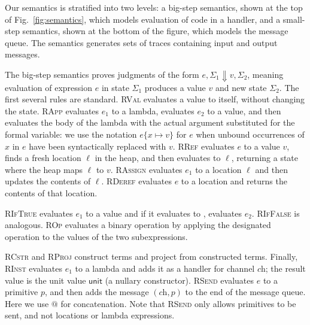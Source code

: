 \documentclass[10pt,conference,compsocconf]{IEEEtran}
\newcommand{\code}[1]{\text{\lstinline!#1!}}
\newcommand{\aset}[1]{\{#1\}}
\newcommand{\sfmt}[1]{\textsf{#1}}
\newcommand{\sch}{\textit{ch}}
\newcommand{\loc}{\ell}
\newcommand{\sunit}{\sfmt{unit}}
\newcommand{\sreduce}{\Downarrow}
\newcommand{\xv}{p}
\newcommand{\comment}[3][\color{red}]{{#1{[{#2}: {#3}]}}}
\newcommand{\kris}[1]{\comment[\color{orange}]{kris}{#1}}
\newcommand{\mrc}[1]{\comment[\color{blue}]{MRC}{#1}}
\begin{document}
Our semantics is stratified into two levels: a big-step semantics,
shown at the top of Fig.~\ref{fig:semantics}, which models evaluation of code in a
handler, and a small-step semantics, shown at the bottom of the
figure, which models the message queue.  The semantics generates sets
of traces containing input and output messages.


The big-step semantics proves judgments of the form
$e, \Sigma_1 \sreduce v, \Sigma_2$, meaning
evaluation of expression $e$ in state $\Sigma_1$ produces a value $v$ and
new state $\Sigma_2$. 
The first several rules are standard.
\textsc{RVal} evaluates a value to itself, without changing the
state. \textsc{RApp} evaluates $e_1$ to a lambda, evaluates $e_2$ to
a value, and then evaluates the body of the lambda with the actual
argument substituted for the formal variable: we use the notation
$e\aset{x\mapsto v}$ for $e$ when unbound occurrences of $x$ in $e$
have been syntactically replaced with $v$. 
\textsc{RRef} evaluates $e$ to a value $v$, finds a fresh location
$\loc$ in the heap, and then evaluates to $\loc$, returning a state
where the heap maps $\loc$ to $v$. \textsc{RAssign} evaluates $e_1$
to a location $\loc$ and then updates the contents of
$\loc$. \textsc{RDeref} evaluates $e$ to a location and returns the
contents of that location.

\textsc{RIfTrue} evaluates $e_1$ to a value and if it evaluates to
\code{true}, evaluates $e_2$. \textsc{RIfFalse} is
analogous.
\textsc{ROp} evaluates a binary operation by applying the designated
operation to the values of the two subexpressions.

\textsc{RCstr} and \textsc{RProj} construct terms and project from
constructed terms. Finally, \textsc{RInst} evaluates $e_1$ to a lambda
and adds it as a handler for channel $\sch$; the result value is the
unit value $\sunit$ (a nullary constructor). \textsc{RSend} evaluates
$e$ to a primitive $\xv$, and then adds the message $(\sch,\xv)$ to the
end of the message queue. Here we use $@$ for concatenation. Note that \textsc{RSend} only allows
primitives to be sent, and not locations or lambda
expressions.
\end{document}
